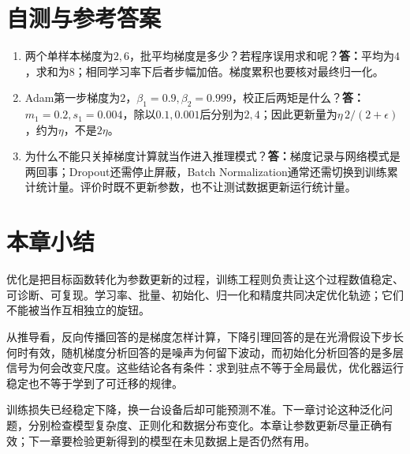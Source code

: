 \section{自测与参考答案}
\begin{enumerate}
\item 两个单样本梯度为$2,6$，批平均梯度是多少？若程序误用求和呢？\textbf{答：}平均为$4$，求和为$8$；相同学习率下后者步幅加倍。梯度累积也要核对最终归一化。
\item Adam第一步梯度为$2$，$\beta_1=0.9,\beta_2=0.999$，校正后两矩是什么？\textbf{答：}$m_1=0.2,s_1=0.004$，除以$0.1,0.001$后分别为$2,4$；因此更新量为$\eta\,2/(2+\epsilon)$，约为$\eta$，不是$2\eta$。
\item 为什么不能只关掉梯度计算就当作进入推理模式？\textbf{答：}梯度记录与网络模式是两回事；Dropout还需停止屏蔽，Batch Normalization通常还需切换到训练累计统计量。评价时既不更新参数，也不让测试数据更新运行统计量。
\end{enumerate}

\section{本章小结}
优化是把目标函数转化为参数更新的过程，训练工程则负责让这个过程数值稳定、可诊断、可复现。学习率、批量、初始化、归一化和精度共同决定优化轨迹；它们不能被当作互相独立的旋钮。

从推导看，反向传播回答的是梯度怎样计算，下降引理回答的是在光滑假设下步长何时有效，随机梯度分析回答的是噪声为何留下波动，而初始化分析回答的是多层信号为何会改变尺度。这些结论各有条件：求到驻点不等于全局最优，优化器运行稳定也不等于学到了可迁移的规律。

训练损失已经稳定下降，换一台设备后却可能预测不准。下一章讨论这种泛化问题，分别检查模型复杂度、正则化和数据分布变化。本章让参数更新尽量正确有效；下一章要检验更新得到的模型在未见数据上是否仍然有用。
